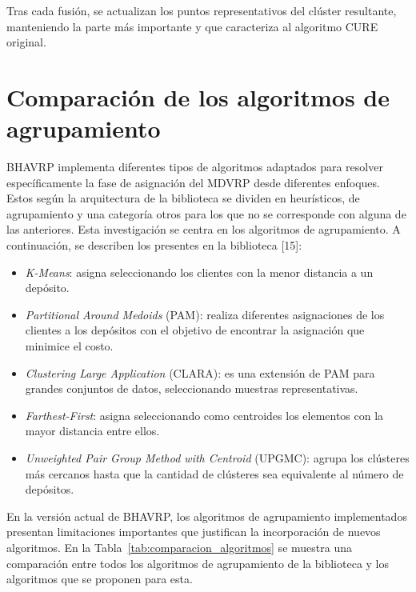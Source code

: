 Tras cada fusi\'on, se actualizan los puntos representativos del cl\'uster resultante, manteniendo la parte m\'as importante y que caracteriza al algoritmo CURE original.

\section{Comparaci\'on de los algoritmos de agrupamiento}

BHAVRP implementa diferentes tipos de algoritmos adaptados para resolver espec\'ificamente la fase de asignaci\'on del MDVRP desde diferentes enfoques. Estos seg\'un la arquitectura de la biblioteca se dividen en heur\'isticos, de agrupamiento y una categor\'ia otros para los que no se corresponde con alguna de las anteriores. Esta investigaci\'on se centra en los algoritmos de agrupamiento. A continuaci\'on, se describen los presentes en la biblioteca [15]:

\begin{itemize}
  \item \textit{K-Means}: asigna seleccionando los clientes con la menor distancia a un dep\'osito.
  \item \textit{Partitional Around Medoids} (PAM): realiza diferentes asignaciones de los clientes a los dep\'ositos con el objetivo de encontrar la asignaci\'on que minimice el costo.
  \item \textit{Clustering Large Application} (CLARA): es una extensi\'on de PAM para grandes conjuntos de datos, seleccionando muestras representativas.
  \item \textit{Farthest-First}: asigna seleccionando como centroides los elementos con la mayor distancia entre ellos.
  \item \textit{Unweighted Pair Group Method with Centroid} (UPGMC): agrupa los cl\'usteres m\'as cercanos hasta que la cantidad de cl\'usteres sea equivalente al n\'umero de dep\'ositos.
\end{itemize}

En la versi\'on actual de BHAVRP, los algoritmos de agrupamiento implementados presentan limitaciones importantes que justifican la incorporaci\'on de nuevos algoritmos. En la Tabla~\ref{tab:comparacion_algoritmos} se muestra una comparaci\'on entre todos los algoritmos de agrupamiento de la biblioteca y los algoritmos que se proponen para esta.

